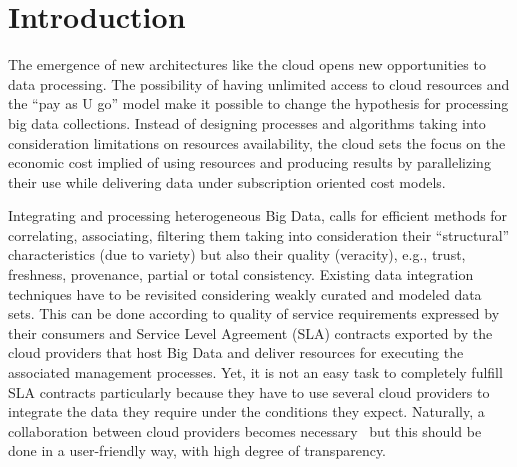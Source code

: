\section{Introduction}
\label{sec:intro}


The emergence of new architectures like the cloud opens new opportunities to data processing. 
The possibility of having unlimited access to cloud resources and the ``pay as U go'' model make it possible to change the hypothesis for processing big  data collections.  Instead of designing processes and algorithms taking into consideration  limitations on resources availability, the cloud sets the focus on the economic cost implied of using resources and producing results by parallelizing their use while delivering data under subscription oriented cost models.
 
Integrating and processing heterogeneous Big Data, calls for efficient methods for correlating, associating, filtering them taking into consideration their ``structural'' characteristics (due to variety) but also their quality (veracity), e.g., trust, freshness, provenance, partial or total consistency. 
Existing data integration techniques have to be revisited considering weakly curated and modeled data sets. This can be done according to quality of service requirements expressed by their consumers and Service Level Agreement (SLA) contracts exported by the cloud providers that host  Big Data and deliver resources for executing the associated management processes. Yet, it is not an easy task to completely fulfill   SLA contracts particularly because they have to use several cloud providers to integrate the data they require under the conditions they expect.
Naturally, a collaboration between cloud providers becomes necessary~\cite{036} but this should be done in a user-friendly way, with high degree of transparency. 

